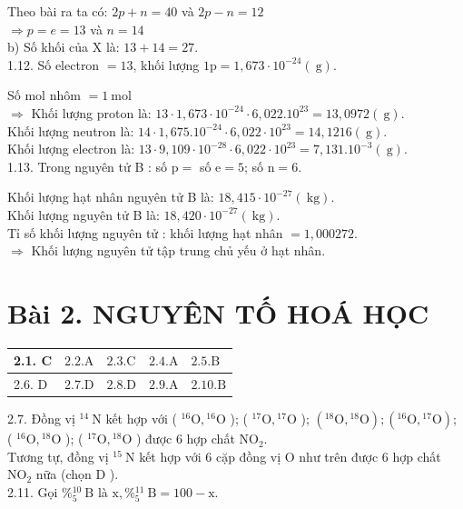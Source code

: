 \documentclass[10pt]{article}
\begin{document}
Theo bài ra ta có: $2 p+n=40$ và $2 p-n=12$\\
$\Rightarrow p=e=13$ và $n=14$\\
b) Số khối của X là: $13+14=27$.\\
1.12. Số electron $=13$, khối lượng $1 \mathrm{p}=1,673 \cdot 10^{-24}(\mathrm{~g})$.

Số mol nhôm $=1 \mathrm{~mol}$\\
$\Rightarrow$ Khối lượng proton là: $13 \cdot 1,673 \cdot 10^{-24} \cdot 6,022.10^{23}=13,0972(\mathrm{~g})$.\\
Khối lượng neutron là: $14 \cdot 1,675.10^{-24} \cdot 6,022 \cdot 10^{23}=14,1216(\mathrm{~g})$.\\
Khối lượng electron là: $13 \cdot 9,109 \cdot 10^{-28} \cdot 6,022 \cdot 10^{23}=7,131.10^{-3}(\mathrm{~g})$.\\
1.13. Trong nguyên tử B : số $\mathrm{p}=$ số $\mathrm{e}=5$; số $\mathrm{n}=6$.

Khối lượng hạt nhân nguyên tử B là: $18,415 \cdot 10^{-27}(\mathrm{~kg})$.\\
Khối lượng nguyên tử B là: $18,420 \cdot 10^{-27}(\mathrm{~kg})$.\\
Tỉ số khối lượng nguyên tử : khối lượng hạt nhân $=1,000272$.\\
$\Rightarrow$ Khối lượng nguyên tử tập trung chủ yếu ở hạt nhân.

\section*{Bài 2. NGUYÊN TỐ HOÁ HỌC}
\begin{center}
\begin{tabular}{|l|l|l|l|l|}
\hline
2.1. C & $2.2 . \mathrm{A}$ & $2.3 . \mathrm{C}$ & $2.4 . \mathrm{A}$ & $2.5 . \mathrm{B}$ \\
\hline
2.6. D & $2.7 . \mathrm{D}$ & $2.8 . \mathrm{D}$ & $2.9 . \mathrm{A}$ & $2.10 . \mathrm{B}$ \\
\hline
\end{tabular}
\end{center}

2.7. Đồng vị ${ }^{14} \mathrm{~N}$ kết hợp với ( ${ }^{16} \mathrm{O},{ }^{16} \mathrm{O}$ ); ( ${ }^{17} \mathrm{O},{ }^{17} \mathrm{O}$ ); $\left({ }^{18} \mathrm{O},{ }^{18} \mathrm{O}\right) ;\left({ }^{16} \mathrm{O},{ }^{17} \mathrm{O}\right)$; ( ${ }^{16} \mathrm{O},{ }^{18} \mathrm{O}$ ); ( ${ }^{17} \mathrm{O},{ }^{18} \mathrm{O}$ ) được 6 hợp chất $\mathrm{NO}_{2}$.\\
Tương tự, đồng vị ${ }^{15} \mathrm{~N}$ kết hợp với 6 cặp đồng vị O như trên được 6 hợp chất $\mathrm{NO}_{2}$ nữa (chọn D ).\\
2.11. Gọi $\%{ }_{5}^{10} \mathrm{~B}$ là $\mathrm{x}, \%{ }_{5}^{11} \mathrm{~B}=100-\mathrm{x}$.
\end{document}
